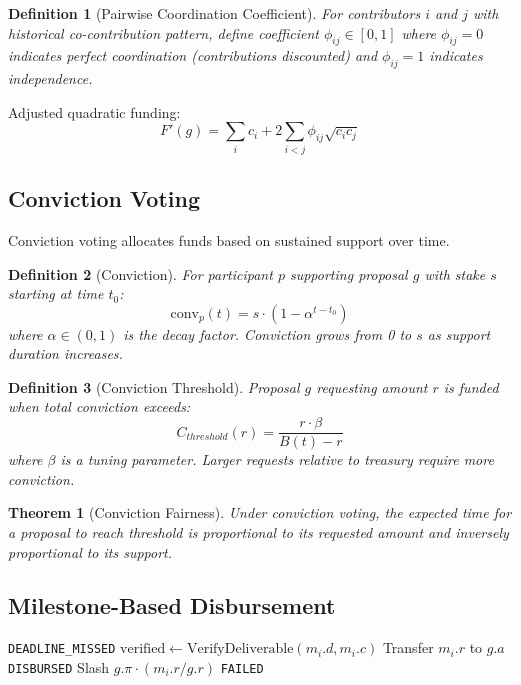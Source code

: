\documentclass[11pt,a4paper]{article}
\newtheorem{definition}{Definition}
\newtheorem{theorem}{Theorem}
\begin{document}
\begin{definition}[Pairwise Coordination Coefficient]
For contributors $i$ and $j$ with historical co-contribution pattern, define coefficient $\phi_{ij} \in [0, 1]$ where $\phi_{ij} = 0$ indicates perfect coordination (contributions discounted) and $\phi_{ij} = 1$ indicates independence.
\end{definition}

Adjusted quadratic funding:
\[
F'(g) = \sum_{i} c_i + 2 \sum_{i < j} \phi_{ij} \sqrt{c_i c_j}
\]

\subsection{Conviction Voting}

Conviction voting allocates funds based on sustained support over time.

\begin{definition}[Conviction]
For participant $p$ supporting proposal $g$ with stake $s$ starting at time $t_0$:
\[
\text{conv}_p(t) = s \cdot (1 - \alpha^{t - t_0})
\]
where $\alpha \in (0, 1)$ is the decay factor. Conviction grows from 0 to $s$ as support duration increases.
\end{definition}

\begin{definition}[Conviction Threshold]
Proposal $g$ requesting amount $r$ is funded when total conviction exceeds:
\[
C_{threshold}(r) = \frac{r \cdot \beta}{B(t) - r}
\]
where $\beta$ is a tuning parameter. Larger requests relative to treasury require more conviction.
\end{definition}

\begin{theorem}[Conviction Fairness]
Under conviction voting, the expected time for a proposal to reach threshold is proportional to its requested amount and inversely proportional to its support.
\end{theorem}

\subsection{Milestone-Based Disbursement}

\begin{algorithm}
\caption{Milestone Disbursement}
\begin{algorithmic}[1]
        \State \Return \texttt{DEADLINE\_MISSED}
    \EndIf
    \State $\text{verified} \gets \text{VerifyDeliverable}(m_i.d, m_i.c)$
        \State Transfer $m_i.r$ to $g.a$
        \State \Return \texttt{DISBURSED}
    \Else
        \State Slash $g.\pi \cdot (m_i.r / g.r)$
        \State \Return \texttt{FAILED}
    \EndIf
\EndProcedure
\end{algorithmic}
\end{algorithm}
\end{document}
